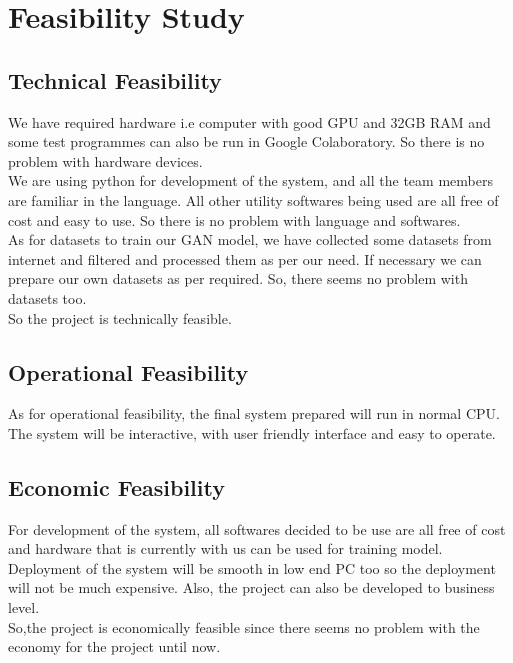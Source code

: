     \chapter{Feasibility Study}
        \section{Technical Feasibility}
        We have required hardware i.e computer with good GPU and 32GB RAM and some test programmes can also be run in Google Colaboratory. So there is no problem with hardware devices.\\
        We are using python for development of the system, and all the team members are familiar in the language. All other utility softwares being used are all free of cost and easy to use. So there is no problem with language and softwares.\\
        As for datasets to train our GAN model, we have collected some datasets from internet and filtered and processed them as per our need. If necessary we can prepare our own datasets as per required. So, there seems no problem with datasets too.\\
        So the project is technically feasible.
        \section{Operational Feasibility}
        As for operational feasibility, the final system prepared will run in normal CPU. The system will be interactive, with user friendly interface and easy to operate.        
        \section{Economic Feasibility}
        For development of the system, all softwares decided to be use are all free of cost and hardware that is currently with us can be used for training model.\\
        Deployment of the system will be smooth in low end PC too so the deployment will not be much expensive. Also, the project can also be developed to business level.\\
        So,the project is economically feasible since there seems no problem with the economy for the project until now.


